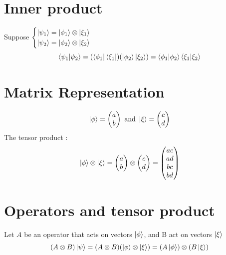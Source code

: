 \documentclass[12pt,oneside]{book}
\begin{document}
\section{Inner product}
Suppose $ \begin{cases}
        \ket{\psi_1} = \ket{\phi_1} \otimes\ket{\xi_1} \\
        \ket{\psi_2} = \ket{\phi_2} \otimes \ket{\xi_2}
    \end{cases}$
\[ \braket{\psi_1|\psi_2} =  ( \bra{\phi_1}\bra{\xi_1} )(\ket{\phi_2}\ket{\xi_{2}}) = \braket{\phi_1|\phi_2}\braket{\xi_1|\xi_2} \]
\section{Matrix Representation}
\[ \ket{\phi} =  \left( \begin{matrix}
            a \\
            b
        \end{matrix}\right) \text{ and } \ket{\xi} = \left( \begin{matrix}
            c \\
            d
        \end{matrix}\right) \]
The tensor product :
\[ \ket{\phi} \otimes  \ket{\xi} =
    \left( \begin{matrix}
            a \\
            b
        \end{matrix}\right) \otimes \left( \begin{matrix}
            c \\
            d
        \end{matrix}\right) =  \left( \begin{matrix}
            ac \\
            ad \\
            bc \\
            bd
        \end{matrix}\right)
\]
\section{Operators and tensor product}
Let $A$ be an operator that acts on vectors $\ket{\phi}$, and B act on vectors $\ket{\xi}$
\[ (A\otimes B)\ket{\psi} = (A\otimes B)(\ket{\phi}\otimes\ket{\xi})=(A\ket{\phi})\otimes(B\ket{\xi}) \]
\end{document}
